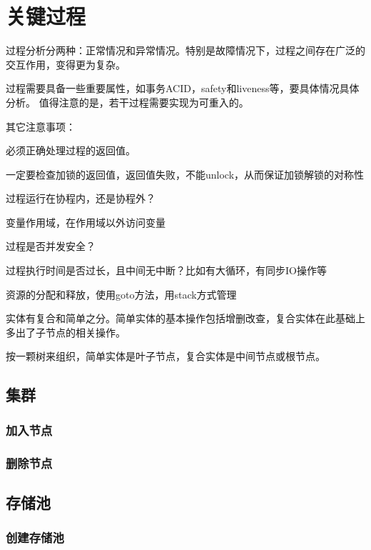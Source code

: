 \chapter{关键过程}

过程分析分两种：正常情况和异常情况。特别是故障情况下，过程之间存在广泛的交互作用，变得更为复杂。

过程需要具备一些重要属性，如事务ACID，safety和liveness等，要具体情况具体分析。
值得注意的是，若干过程需要实现为可重入的。

其它注意事项：
\begin{compactenum}
\item 必须正确处理过程的返回值。
\item 一定要检查加锁的返回值，返回值失败，不能unlock，从而保证加锁解锁的对称性
\item 过程运行在协程内，还是协程外？
\item 变量作用域，在作用域以外访问变量
\item 过程是否并发安全？
\item 过程执行时间是否过长，且中间无中断？比如有大循环，有同步IO操作等
\item 资源的分配和释放，使用goto方法，用stack方式管理
\end{compactenum}

实体有复合和简单之分。简单实体的基本操作包括增删改查，复合实体在此基础上多出了子节点的相关操作。

按一颗树来组织，简单实体是叶子节点，复合实体是中间节点或根节点。

\section{集群}

\subsection{加入节点}
\subsection{删除节点}

\section{存储池}

\subsection{创建存储池}

